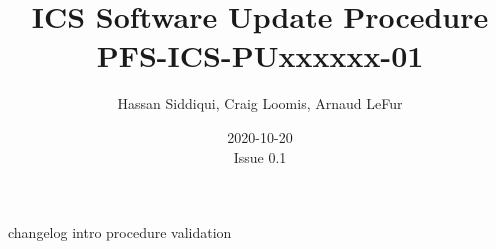 \documentclass[12pt]{article}
\begin{document}
\title{\acrshort{ICS} Software Update Procedure \\ \large PFS-ICS-PUxxxxxx-01} 
\author{Hassan Siddiqui, Craig Loomis, Arnaud LeFur}
\date{2020-10-20\\Issue 0.1}
\maketitle

\tableofcontents
\newpage

%
%
{changelog}
{intro}
{procedure}
{validation}
\newpage

%
%
\printglossary[type=\acronymtype]
\printglossary
\end{document}
